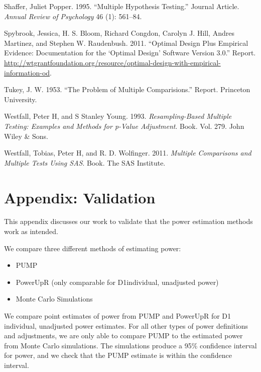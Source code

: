 \documentclass[
]{article}
\providecommand{\tightlist}{%
  \setlength{\itemsep}{0pt}\setlength{\parskip}{0pt}}
\newlength{\cslhangindent}
\newlength{\cslentryspacingunit} %
\newenvironment{CSLReferences}[2] %
 {%
  \setlength{\parindent}{0pt}
  \ifodd #1
  \let\oldpar\par
  \def\par{\hangindent=\cslhangindent\oldpar}
  \fi
  \setlength{\parskip}{#2\cslentryspacingunit}
 }%
 {}
\begin{document}
\begin{CSLReferences}{1}{0}
\leavevmode{}%
Shaffer, Juliet Popper. 1995. {``Multiple Hypothesis Testing.''} Journal
Article. \emph{Annual Review of Psychology} 46 (1): 561--84.

\leavevmode{}%
Spybrook, Jessica, H. S. Bloom, Richard Congdon, Carolyn J. Hill, Andres
Martinez, and Stephen W. Raudenbush. 2011. {``Optimal Design Plus
Empirical Evidence: Documentation for the {`Optimal Design'} Software
Version 3.0.''} Report.
\url{http://wtgrantfoundation.org/resource/optimal-design-with-empirical-information-od}.

\leavevmode{}%
Tukey, J. W. 1953. {``The Problem of Multiple Comparisions.''} Report.
Princeton University.

\leavevmode{}%
Westfall, Peter H, and S Stanley Young. 1993. \emph{Resampling-Based
Multiple Testing: Examples and Methods for p-Value Adjustment}. Book.
Vol. 279. John Wiley \& Sons.

\leavevmode{}%
Westfall, Tobias, Peter H, and R. D. Wolfinger. 2011. \emph{Multiple
Comparisons and Multiple Tests Using SAS}. Book. The SAS Institute.

\end{CSLReferences}

\section{Appendix: Validation}

This appendix discusses our work to validate that the power estimation
methods work as intended.

We compare three different methods of estimating power:

\begin{itemize}
\tightlist
\item
  PUMP
\item
  PowerUpR (only comparable for D1individual, unadjusted power)
\item
  Monte Carlo Simulations
\end{itemize}

We compare point estimates of power from PUMP and PowerUpR for D1
individual, unadjusted power estimates. For all other types of power
definitions and adjustments, we are only able to compare PUMP to the
estimated power from Monte Carlo simulations. The simulations produce a
95\% confidence interval for power, and we check that the PUMP estimate
is within the confidence interval.
\end{document}
